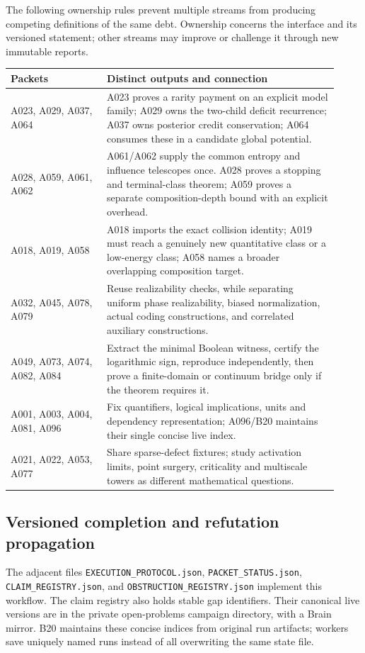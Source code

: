 \documentclass[11pt]{article}
\begin{document}
The following ownership rules prevent multiple streams from producing competing definitions of the same debt. Ownership concerns the interface and its versioned statement; other streams may improve or challenge it through new immutable reports.

\begin{longtable}{>{\raggedright\arraybackslash}p{0.27\linewidth}>{\raggedright\arraybackslash}p{0.65\linewidth}}
\toprule
Packets & Distinct outputs and connection \\
\midrule\endhead
A023, A029, A037, A064 & A023 proves a rarity payment on an explicit model family; A029 owns the two-child deficit recurrence; A037 owns posterior credit conservation; A064 consumes these in a candidate global potential. \\
A028, A059, A061, A062 & A061/A062 supply the common entropy and influence telescopes once. A028 proves a stopping and terminal-class theorem; A059 proves a separate composition-depth bound with an explicit overhead. \\
A018, A019, A058 & A018 imports the exact collision identity; A019 must reach a genuinely new quantitative class or a low-energy class; A058 names a broader overlapping composition target. \\
A032, A045, A078, A079 & Reuse realizability checks, while separating uniform phase realizability, biased normalization, actual coding constructions, and correlated auxiliary constructions. \\
A049, A073, A074, A082, A084 & Extract the minimal Boolean witness, certify the logarithmic sign, reproduce independently, then prove a finite-domain or continuum bridge only if the theorem requires it. \\
A001, A003, A004, A081, A096 & Fix quantifiers, logical implications, units and dependency representation; A096/B20 maintains their single concise live index. \\
A021, A022, A053, A077 & Share sparse-defect fixtures; study activation limits, point surgery, criticality and multiscale towers as different mathematical questions. \\
\bottomrule
\end{longtable}

\subsection{Versioned completion and refutation propagation}

The adjacent files \texttt{EXECUTION\_PROTOCOL.json}, \texttt{PACKET\_STATUS.json}, \texttt{CLAIM\_REGISTRY.json}, and \texttt{OBSTRUCTION\_REGISTRY.json} implement this workflow. The claim registry also holds stable gap identifiers. Their canonical live versions are in the private open-problems campaign directory, with a Brain mirror. B20 maintains these concise indices from original run artifacts; workers save uniquely named runs instead of all overwriting the same state file.
\end{document}

